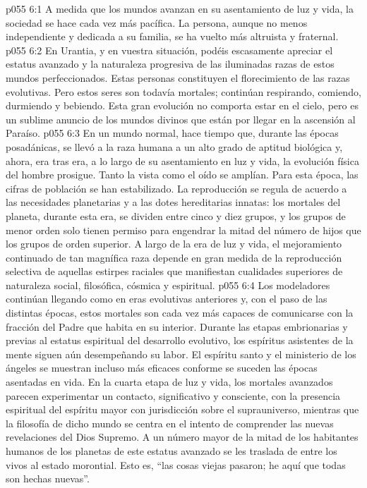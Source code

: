 \vs p055 6:1 A medida que los mundos avanzan en su asentamiento de luz y vida, la sociedad se hace cada vez más pacífica. La persona, aunque no menos independiente y dedicada a su familia, se ha vuelto más altruista y fraternal.
\vs p055 6:2 En Urantia, y en vuestra situación, podéis escasamente apreciar el estatus avanzado y la naturaleza progresiva de las iluminadas razas de estos mundos perfeccionados. Estas personas constituyen el florecimiento de las razas evolutivas. Pero estos seres son todavía mortales; continúan respirando, comiendo, durmiendo y bebiendo. Esta gran evolución no comporta estar en el cielo, pero es un sublime anuncio de los mundos divinos que están por llegar en la ascensión al Paraíso.
\vs p055 6:3 En un mundo normal, hace tiempo que, durante las épocas posadánicas, se llevó a la raza humana a un alto grado de aptitud biológica y, ahora, era tras era, a lo largo de su asentamiento en luz y vida, la evolución física del hombre prosigue. Tanto la vista como el oído se amplían. Para esta época, las cifras de población se han estabilizado. La reproducción se regula de acuerdo a las necesidades planetarias y a las dotes hereditarias innatas: los mortales del planeta, durante esta era, se dividen entre cinco y diez grupos, y los grupos de menor orden solo tienen permiso para engendrar la mitad del número de hijos que los grupos de orden superior. A largo de la era de luz y vida, el mejoramiento continuado de tan magnífica raza depende en gran medida de la reproducción selectiva de aquellas estirpes raciales que manifiestan cualidades superiores de naturaleza social, filosófica, cósmica y espiritual.
\vs p055 6:4 \pc Los modeladores continúan llegando como en eras evolutivas anteriores y, con el paso de las distintas épocas, estos mortales son cada vez más capaces de comunicarse con la fracción del Padre que habita en su interior. Durante las etapas embrionarias y previas al estatus espiritual del desarrollo evolutivo, los espíritus asistentes de la mente siguen aún desempeñando su labor. El espíritu santo y el ministerio de los ángeles se muestran incluso más eficaces conforme se suceden las épocas asentadas en vida. En la cuarta etapa de luz y vida, los mortales avanzados parecen experimentar un contacto, significativo y consciente, con la presencia espiritual del espíritu mayor con jurisdicción sobre el suprauniverso, mientras que la filosofía de dicho mundo se centra en el intento de comprender las nuevas revelaciones del Dios Supremo. A un número mayor de la mitad de los habitantes humanos de los planetas de este estatus avanzado se les traslada de entre los vivos al estado morontial. Esto es, “las cosas viejas pasaron; he aquí que todas son hechas nuevas”.
